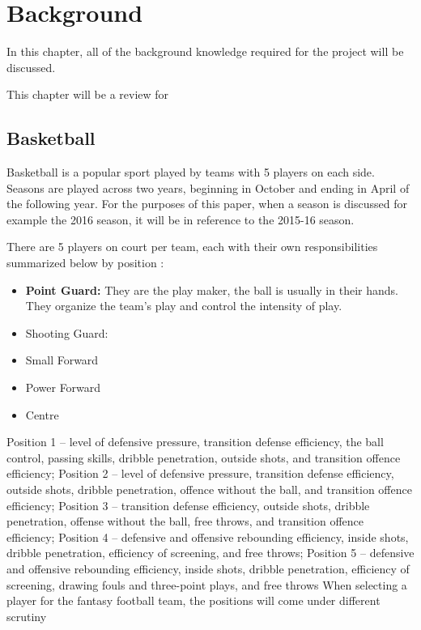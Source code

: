 \chapter{Background}

In this chapter, all of the background knowledge required for the project will be discussed.

This chapter will be a review for\cite{theoretical_stat}

\section{Basketball}
Basketball is a popular sport played by teams with 5 players on each side.  Seasons are played across two years, beginning in October and ending in April of the following year.  For the purposes of this paper, when a season is discussed for example the 2016 season, it will be in reference to the 2015-16 season.

There are 5 players on court per team, each with their own responsibilities summarized below by position \cite{player_criteria}:

\begin{itemize}
	\item \textbf{Point Guard:} They are the play maker, the ball is usually in their hands.  They organize the team's play and control the intensity of play.
	\item Shooting Guard:
	\item Small Forward
	\item Power Forward
	\item Centre 
\end{itemize}
Position 1 – level of defensive pressure, transition defense efficiency, the ball control,
passing skills, dribble penetration, outside shots, and transition offence efficiency;
Position 2 – level of defensive pressure, transition defense efficiency, outside shots,
dribble penetration, offence without the ball, and transition offence efficiency;
Position 3 – transition defense efficiency, outside shots, dribble penetration, offense
without the ball, free throws, and transition offence efficiency;
Position 4 – defensive and offensive rebounding efficiency, inside shots, dribble penetration,
efficiency of screening, and free throws;
Position 5 – defensive and offensive rebounding efficiency, inside shots, dribble penetration,
efficiency of screening, drawing fouls and three-point plays, and free throws
When selecting a player for the fantasy football team, the positions will come under different scrutiny 


